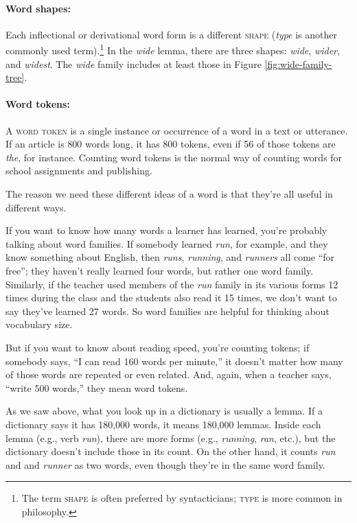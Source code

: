 \paragraph*{Word shapes:}Each inflectional or derivational word form is a different \textsc{shape} (\textit{type} is another commonly used term).\footnote{The term \textsc{shape} is often preferred by syntacticians; \textsc{type} is more common in philosophy.} In the \textit{wide} lemma, there are three shapes: \textit{wide}, \textit{wider}, and \textit{widest}. The \textit{wide} family includes at least those in Figure \ref{fig:wide-family-tree}.

\paragraph*{Word tokens:}A \textsc{word token} is a single instance or occurrence of a word in a text or utterance. If an article is 800 words long, it has 800 tokens, even if 56 of those tokens are \textit{the}, for instance. Counting word tokens is the normal way of counting words for school assignments and publishing.

The reason we need these different ideas of a word is that they're all useful in different ways. 

If you want to know how many words a learner has learned, you're probably talking about word families. If somebody learned \textit{run}, for example, and they know something about English, then \textit{runs}, \textit{running}, and \textit{runners} all come ``for free''; they haven't really learned four words, but rather one word family. Similarly, if the teacher used members of the \textit{run} family in its various forms 12 times during the class and the students also read it 15 times, we don't want to say they've learned 27 words. So word families are helpful for thinking about vocabulary size.

But if you want to know about reading speed, you're counting tokens; if somebody says, ``I can read 160 words per minute,''  it doesn't matter how many of those words are repeated or even related. And, again, when a teacher says, ``write 500 words,'' they mean word tokens.

As we saw above, what you look up in a dictionary is usually a lemma. If a dictionary says it has 180,000 words, it means 180,000 lemmas. Inside each lemma (e.g., verb \textit{run}), there are more forms (e.g., \textit{running}, \textit{ran}, etc.), but the dictionary doesn't include those in its count. On the other hand, it counts \textit{run} and and \textit{runner} as two words, even though they're in the same word family.

